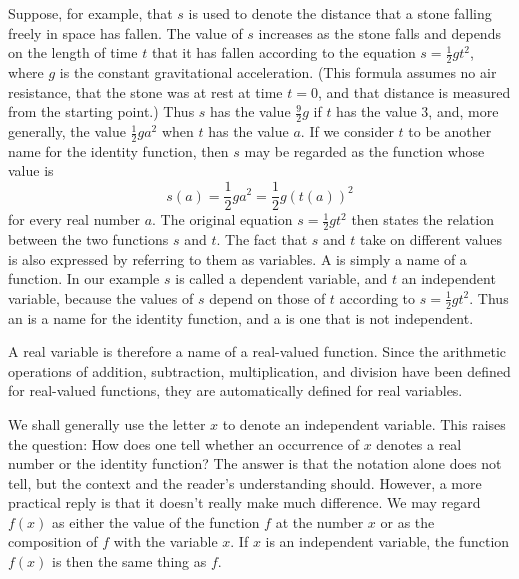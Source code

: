 Suppose, for example,
that $s$ is used to denote the distance
that a stone falling freely in space has fallen.
The value of $s$ increases as the stone falls
and depends on the length of time $t$ that it has fallen
according to the equation
$s= {\frac{1}{2}}g{t^2}$,
where $g$ is the constant gravitational acceleration.
(This formula assumes no air resistance,
that the stone was at rest at time $t = 0$,
and that distance is measured from the starting point.)
Thus $s$ has the value ${\frac{9}{2}}g$
if $t$ has the value $3$,
and, more generally,
the value ${\frac{1}{2}}g{a^2}$
when $t$ has the value $a$.
If we consider $t$ to be another name for the identity function,
then $s$ may be regarded as the function whose value is
\[
s(a) = {\frac{1}{2}}{g{a^2}} = {\frac{1}{2}}{g(t(a))^2}
\]
for every real number $a$.
The original equation $s = {\frac{1}{2}}g{t^2}$ then states
the relation between the two functions $s$ and $t$.
The fact that $s$ and $t$ take on different values
is also expressed by referring to them as variables.
A  is simply a name of a function.
In our example $s$ is called a dependent variable,
and $t$ an independent variable,
because the values of $s$ depend on those of $t$
according to $s = {\frac{1}{2}}g{t^2}$.
Thus an 
is a name for the identity function,
and a  is one that is not independent.

A real variable is therefore a name of a real-valued function.
Since the arithmetic operations of
addition, subtraction, multiplication, and division
have been defined for real-valued functions,
they are automatically defined for real variables.

We shall generally use the letter $x$
to denote an independent variable.
This raises the question:
How does one tell whether an occurrence of $x$
denotes a real number or the identity function?
The answer is that the notation alone does not tell,
but the context and the reader's understanding should.
However, a more practical reply
is that it doesn't really make much difference.
We may regard $f(x)$ as either
the value of the function $f$ at the number $x$
or as the composition of $f$ with the variable $x$.
If $x$ is an independent variable,
the function  $f(x)$ is then the same thing as $f$.

